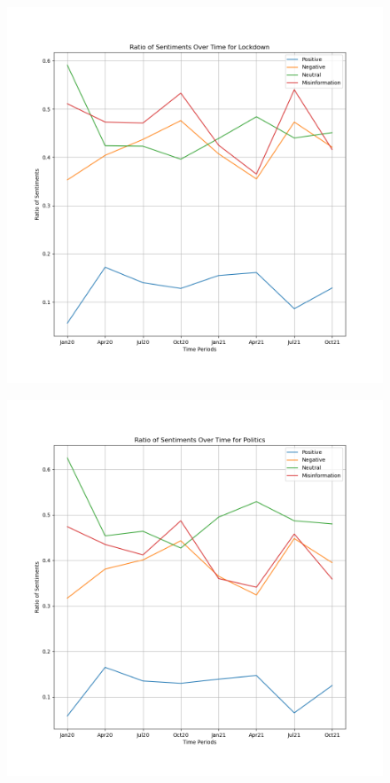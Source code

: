 \documentclass{l4proj}
\begin{document}
\begin{appendices}
\begin{figure}[H]
\begin{minipage}[c]{0.49\linewidth}
\label{fig:ecosen}
\end{minipage}
\end{figure}

\begin{figure}[H]
\begin{minipage}[c]{0.49\linewidth}
\centering
\includegraphics[width=\textwidth]{images/LockdownSentiment.png}
\label{fig:locksen}
\end{minipage}\hfill
\begin{minipage}[c]{0.49\linewidth}
\centering
\includegraphics[width=\textwidth]{images/PoliticsSentiment.png}

\end{minipage}
\end{figure}
\end{appendices}
\end{document}
